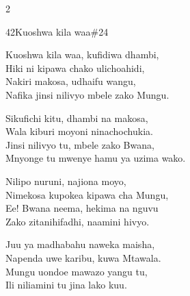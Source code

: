 \begin{multicols}{2}
\begin{hymn}{42}{Kuoshwa kila waa}{\#24}
\begin{stanza}
Kuoshwa kila waa, kufidiwa dhambi,\\
Hiki ni kipawa chako ulichoahidi,\\
Nakiri makosa, udhaifu wangu,\\
Nafika jinsi nilivyo mbele zako Mungu.
\end{stanza}
\begin{stanza}
Sikufichi kitu, dhambi na makosa,\\
Wala kiburi moyoni ninachochukia.\\
Jinsi nilivyo tu, mbele zako Bwana,\\
Mnyonge tu mwenye hamu ya uzima wako.
\end{stanza}
\begin{stanza}
Nilipo nuruni, najiona moyo,\\
Nimekosa kupokea kipawa cha Mungu,\\
Ee! Bwana neema, hekima na nguvu\\
Zako zitanihifadhi, naamini hivyo.
\end{stanza}
\begin{stanza}
Juu ya madhabahu naweka maisha,\\
Napenda uwe karibu, kuwa Mtawala.\\
Mungu uondoe mawazo yangu tu,\\
Ili niliamini tu jina lako kuu.
\end{stanza}
\end{hymn}


\end{multicols}
